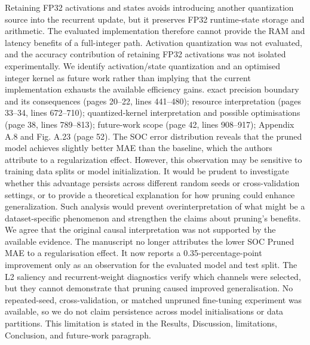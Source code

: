 {}Retaining FP32 activations and states avoids introducing another quantization source into the recurrent update, but it preserves FP32 runtime-state storage and arithmetic. The evaluated implementation therefore cannot provide the RAM and latency benefits of a full-integer path. Activation quantization was not evaluated, and the accuracy contribution of retaining FP32 activations was not isolated experimentally. We identify activation/state quantization and an optimised integer kernel as future work rather than implying that the current implementation exhausts the available efficiency gains.\markdownRendererParagraphSeparator
{} exact precision boundary and its consequences (pages 20--22, lines 441--480); resource interpretation (pages 33--34, lines 672--710); quantized-kernel interpretation and possible optimisations (page 38, lines 789--813); future-work scope (page 42, lines 908--917); Appendix A.8 and Fig. A.23 (page 52).\markdownRendererInterblockSeparator
{}
\markdownRendererSectionEnd \markdownRendererSectionBegin
{}\markdownRendererInterblockSeparator
{}\markdownRendererBlockQuoteBegin
The SOC error distribution reveals that the pruned model achieves slightly better MAE than the baseline, which the authors attribute to a regularization effect. However, this observation may be sensitive to training data splits or model initialization. It would be prudent to investigate whether this advantage persists across different random seeds or cross-validation settings, or to provide a theoretical explanation for how pruning could enhance generalization. Such analysis would prevent overinterpretation of what might be a dataset-specific phenomenon and strengthen the claims about pruning's benefits.\markdownRendererBlockQuoteEnd \markdownRendererInterblockSeparator
{} We agree that the original causal interpretation was not supported by the available evidence. The manuscript no longer attributes the lower SOC Pruned MAE to a regularisation effect. It now reports a 0.35-percentage-point improvement only as an observation for the evaluated model and test split. The L2 saliency and recurrent-weight diagnostics verify which channels were selected, but they cannot demonstrate that pruning caused improved generalisation.\markdownRendererParagraphSeparator
{}No repeated-seed, cross-validation, or matched unpruned fine-tuning experiment was available, so we do not claim persistence across model initialisations or data partitions. This limitation is stated in the Results, Discussion, limitations, Conclusion, and future-work paragraph.\markdownRendererParagraphSeparator
